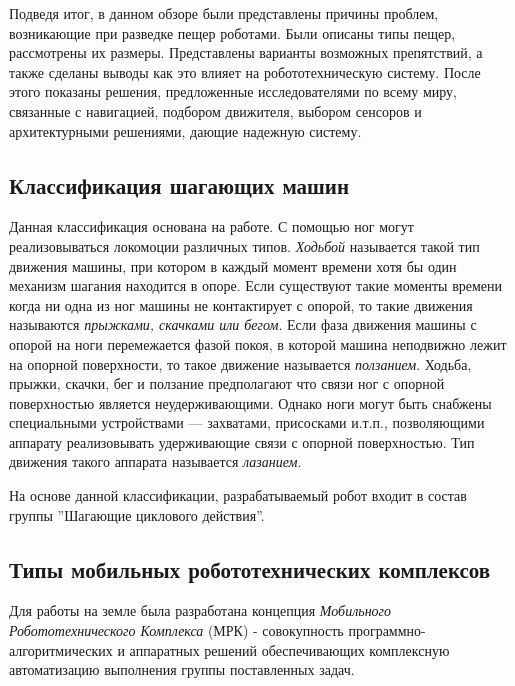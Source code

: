 Подведя итог, в данном обзоре были представлены причины проблем, возникающие при разведке пещер роботами. Были описаны типы пещер, рассмотрены их размеры. Представлены варианты возможных препятствий, а также сделаны выводы как это влияет на робототехническую систему. После этого показаны решения, предложенные исследователями по всему миру, связанные с навигацией, подбором движителя, выбором сенсоров и архитектурными решениями, дающие надежную систему. 

\subsection{Классификация шагающих машин}
Данная классификация основана на  \cite{Maloletov2015dinamica} работе. С помощью ног могут реализовываться локомоции различных типов. \textit{Ходьбой} называется такой тип движения машины, при котором в каждый момент времени хотя бы один механизм шагания находится в опоре. Если существуют такие моменты времени когда ни одна из ног машины не контактирует с опорой, то такие движения называются \textit{прыжками, скачками или бегом}. Если фаза движения машины с опорой на ноги перемежается фазой покоя, в которой машина неподвижно лежит на опорной поверхности, то такое движение называется \textit{ползанием}. Ходьба, прыжки, скачки, бег и ползание предполагают что связи ног с опорной поверхностью является неудерживающими. Однако ноги могут быть снабжены специальными устройствами — захватами, присосками и.т.п., позволяющими аппарату реализовывать удерживающие связи с опорной поверхностью. Тип движения такого аппарата называется \textit{лазанием}.

На основе данной классификации, разрабатываемый робот входит в состав группы ''Шагающие циклового действия''.

\subsection{Типы мобильных робототехнических комплексов}
Для работы на земле была разработана концепция \textit{Мобильного Робототехнического Комплекса} (МРК) -  совокупность программно-алгоритмических и аппаратных решений обеспечивающих комплексную автоматизацию выполнения группы поставленных задач.

